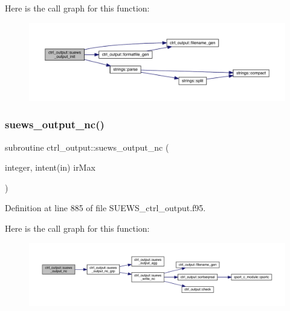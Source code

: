 Here is the call graph for this function\+:\nopagebreak
\begin{figure}[H]
\begin{center}
\leavevmode
\includegraphics[width=350pt]{namespacectrl__output_aa089b1e6d88c1556fb0d0f645face272_cgraph}
\end{center}
\end{figure}
\mbox{\label{namespacectrl__output_abe2b9152111665466982f35349bf24d8}} 
\subsubsection{\texorpdfstring{suews\+\_\+output\+\_\+nc()}{suews\_output\_nc()}}
{\footnotesize\ttfamily subroutine ctrl\+\_\+output\+::suews\+\_\+output\+\_\+nc (\begin{DoxyParamCaption}\item[{integer, intent(in)}]{ir\+Max }\end{DoxyParamCaption})}



Definition at line 885 of file S\+U\+E\+W\+S\+\_\+ctrl\+\_\+output.\+f95.

Here is the call graph for this function\+:\nopagebreak
\begin{figure}[H]
\begin{center}
\leavevmode
\includegraphics[width=350pt]{namespacectrl__output_abe2b9152111665466982f35349bf24d8_cgraph}
\end{center}
\end{figure}
\mbox{\label{namespacectrl__output_a333bec5a308bd89762292b7f695bdb9b}} 
